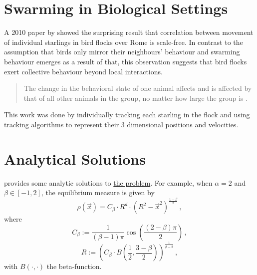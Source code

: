 \section{Swarming in Biological Settings}
A 2010 paper by \citeauthor{2010-starlings} showed the surprising result that correlation between movement of individual starlings in bird flocks over Rome is scale-free.
In contrast to the assumption that birds only mirror their neighbours' behaviour and swarming behaviour emerges as a result of that, this observation suggests that bird flocks exert collective behaviour beyond local interactions.
\begin{quote}
  The change in the behavioral state of one animal affects and is affected by that of all other animals in the group, no matter how large the group is
  \parencite{2010-starlings}.
\end{quote}
This work was done by individually tracking each starling in the flock and using tracking algorithms to represent their 3 dimensional positions and velocities.

\section{Analytical Solutions}
\label{sec:analytical-solutions}
\cite{2017-explicit-solutions} provides some analytic solutions to \hyperref[sec:the-problem]{the problem}.
For example, when $\alpha = 2$ and $\beta \in [-1, 2]$, the equilibrium measure is given by
\begin{equation}
  \rho(\vec{x}) = C_\beta \cdot R^d \cdot \left(R^2 - \vec{x}^2\right)^{\frac{1-\beta}{2}}\,,
  \label{eq:analytical-solution-alpha-equal-2}
\end{equation}
where
$$C_\beta := \frac{1}{(\beta - 1) \pi} \cos\left(\frac{(2 - \beta) \pi}{2}\right)\,,$$
$$R := \left(C_\beta \cdot B\left(\frac{1}{2}, \frac{3 - \beta}{2}\right)\right)^{\frac{1}{\beta - 2}}\,,$$
with $B(\cdot, \cdot)$ the beta-function.

